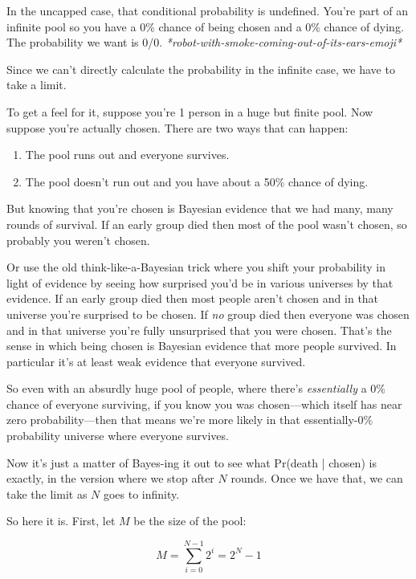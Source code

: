 \documentclass[article,twocolumn]{memoir}
\begin{document}
In the uncapped case, that conditional probability is undefined. 
You're part of an infinite pool so you have a 0\% chance of being chosen and a 0\% chance of dying. 
The probability we want is 0/0. 
\emph{*robot-with-smoke-coming-out-of-its-ears-emoji*}

Since we can't directly calculate the probability in the infinite case, we have to take a limit.

\vspace{2em}

To get a feel for it, suppose you're 1 person in a huge but finite pool.
Now suppose you're actually chosen. 
There are two ways that can happen: 
\begin{enumerate}
\item The pool runs out and everyone survives.
\item The pool doesn't run out and you have about a 50\% chance of dying. 
\end{enumerate}
But knowing that you're chosen is Bayesian evidence that we had many, many rounds of survival. 
If an early group died then most of the pool wasn't chosen, so probably you weren't chosen.

Or use the old think-like-a-Bayesian trick where you shift your probability in light of evidence by seeing how surprised you'd be in various universes by that evidence.
If an early group died then most people aren't chosen and in that universe you're surprised to be chosen. 
If \emph{no} group died then everyone was chosen and in that universe you're fully unsurprised that you were chosen. 
That's the sense in which being chosen is Bayesian evidence that more people survived. 
In particular it's at least weak evidence that everyone survived.

So even with an absurdly huge pool of people, where there's \emph{essentially} a 0\% chance of everyone surviving, if you know you was chosen---which itself has near zero probability---then that means we're more likely in that essentially-0\% probability universe where everyone survives.

\vspace{2em}

Now it's just a matter of Bayes-ing it out to see what Pr(death | chosen) is exactly, in the version where we stop after $N$ rounds.
Once we have that, we can take the limit as $N$ goes to infinity.

So here it is.
First, let $M$ be the size of the pool:

$$M = \sum_{i=0}^{N-1} 2^i = 2^N-1$$
\end{document}
